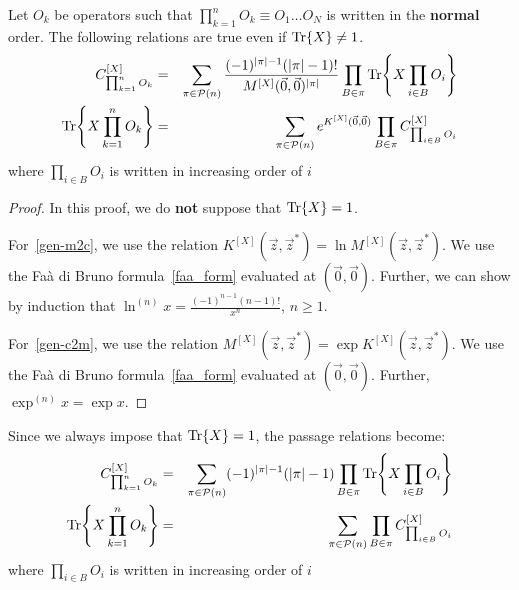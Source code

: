 \begin{theorem} \label{th-m2c-c2m}
    Let $O_k$ be operators such that $\prod_{k=1}^n O_k \equiv O_1 \ldots O_N$ is written in the \textbf{normal} order. The following relations are true even if $\Tr{X} \neq 1$.
    \begin{eqnarray} \label{gen-m2c}
        C^{[X]}_{\prod_{k=1}^n O_k} &=& \sum_{\pi \in \mathcal{P}(n)} \frac{(-1)^{|\pi|-1} (|\pi|-1)!}{M^{[X]}(\Vec{0}, \Vec{0})^{|\pi|}} \prod_{B \in \pi} \Tr{X\prod_{i \in B} O_i}\\ \label{gen-c2m}
        \Tr{X\prod_{k=1}^n O_k} &=& \sum_{\pi \in \mathcal{P}(n)} e^{K^{[X]}(\Vec{0}, \Vec{0})} \prod_{B \in \pi} C^{[X]}_{\prod_{i \in B} O_i}
    \end{eqnarray}
    where $\prod_{i \in B} O_i$ is written in increasing order of $i$
\end{theorem}
\begin{proof}
    In this proof, we do \textbf{not} suppose that $\Tr{X} = 1$.
    
    For~\autoref{gen-m2c}, we use the relation $K^{[X]}(\Vec{z}, \Vec{z}^*) = \ln{M^{[X]}(\Vec{z}, \Vec{z}^*)}$. We use the Faà di Bruno formula~\autoref{faa_form} evaluated at $(\Vec{0}, \Vec{0})$. Further, we can show by induction that $\ln^{(n)}{x} = \frac{(-1)^{n-1} (n-1)!}{x^n}$, $n \ge 1$.

    For~\autoref{gen-c2m}, we use the relation $M^{[X]}(\Vec{z}, \Vec{z}^*) = \exp{K^{[X]}(\Vec{z}, \Vec{z}^*)}$. We use the Faà di Bruno formula~\autoref{faa_form} evaluated at $(\Vec{0}, \Vec{0})$. Further, $\exp^{(n)}{x} = \exp{x}$.
\end{proof}

\begin{corollary}
    Since we always impose that $\Tr{X} = 1$, the passage relations become:
    \begin{eqnarray} \label{m2c}
        C^{[X]}_{\prod_{k=1}^n O_k} &=& \sum_{\pi \in \mathcal{P}(n)} (-1)^{|\pi|-1} (|\pi|-1) \prod_{B \in \pi} \Tr{X\prod_{i \in B} O_i}\\
        \label{c2m}
        \Tr{X\prod_{k=1}^n O_k} &=& \sum_{\pi \in \mathcal{P}(n)} \prod_{B \in \pi} C^{[X]}_{\prod_{i \in B} O_i}
    \end{eqnarray}
    where $\prod_{i \in B} O_i$ is written in increasing order of $i$
\end{corollary}

